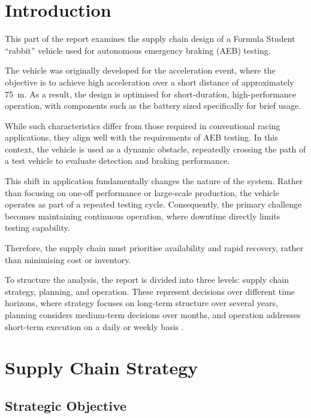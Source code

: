 
\section{Introduction}

This part of the report examines the supply chain design of a Formula Student “rabbit” vehicle used for autonomous emergency braking (AEB) testing.

The vehicle was originally developed for the acceleration event, where the objective is to achieve high acceleration over a short distance of approximately \SI{75}{\meter}. As a result, the design is optimised for short-duration, high-performance operation, with components such as the battery sized specifically for brief usage.

While such characteristics differ from those required in conventional racing applications, they align well with the requirements of AEB testing. In this context, the vehicle is used as a dynamic obstacle, repeatedly crossing the path of a test vehicle to evaluate detection and braking performance.

This shift in application fundamentally changes the nature of the system. Rather than focusing on one-off performance or large-scale production, the vehicle operates as part of a repeated testing cycle. Consequently, the primary challenge becomes maintaining continuous operation, where downtime directly limits testing capability.


Therefore, the supply chain must prioritise availability and rapid recovery, rather than minimising cost or inventory.

To structure the analysis, the report is divided into three levels: supply chain strategy, planning, and operation. These represent decisions over different time horizons, where strategy focuses on long-term structure over several years, planning considers medium-term decisions over months, and operation addresses short-term execution on a daily or weekly basis \cite{Supply_chain_lecture}.

\section{Supply Chain Strategy}

\subsection{Strategic Objective}

